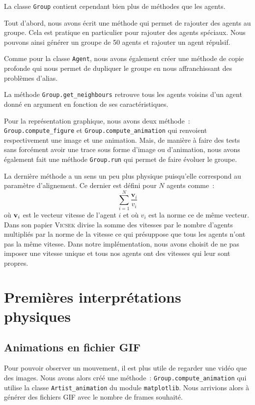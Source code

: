 \documentclass[french, a4paper, 12pt, openany]{report}
\begin{document}
	La classe \verb|Group| contient cependant bien plus de méthodes que les agents.
	
	Tout d'abord, nous avons écrit une méthode qui permet de rajouter des agents au groupe. Cela est pratique en particulier pour rajouter des agents spéciaux. Nous pouvons ainsi générer un groupe de 50 agents et rajouter un agent répulsif.
	
	Comme pour la classe \verb|Agent|, nous avons également créer une méthode de copie profonde qui nous permet de dupliquer le groupe en nous affranchissant des problèmes d'alias.
	
	La méthode \verb|Group.get_neighbours| retrouve tous les agents voisins d'un agent donné en argument en fonction de ses caractéristiques.
	
	Pour la représentation graphique, nous avons deux méthode~: \verb|Group.compute_figure| et \verb|Group.compute_animation| qui renvoient respectivement une image et une animation. Mais, de manière à faire des tests sans forcément avoir une trace sous forme d'image ou d'animation, nous avons également fait une méthode \verb|Group.run| qui permet de faire évoluer le groupe.
	
	La dernière méthode a un sens un peu plus physique puisqu'elle correspond au paramètre d'alignement. Ce dernier est défini pour $N$ agents comme~:
	\[
		\sum_{i=1}^N \frac{\textbf{v}_i}{v_i}
	\]
	\label{formule_align}
	où $\textbf v_i$ est le vecteur vitesse de l'agent $i$ et où $v_i$ est la norme ce de même vecteur. Dans son papier \textsc{Vicsek} divise la somme des vitesses par le nombre d'agents multipliés par la norme de la vitesse ce qui présuppose que tous les agents n'ont pas la même vitesse. Dans notre implémentation, nous avons choisit de ne pas imposer une vitesse unique et tous nos agents ont des vitesses qui leur sont propres.	

   
\chapter{Premières interprétations physiques}
\section{Animations en fichier GIF}

   Pour pouvoir observer un mouvement, il est plus utile de regarder une vidéo que des images. Nous avons alors créé une méthode~: \verb|Group.compute_animation| qui utilise la classe \verb|Artist_animation| du module \verb|matplotlib|. Nous arrivions alors à générer des fichiers GIF avec le nombre de frames souhaité.\\
   
\end{document}
